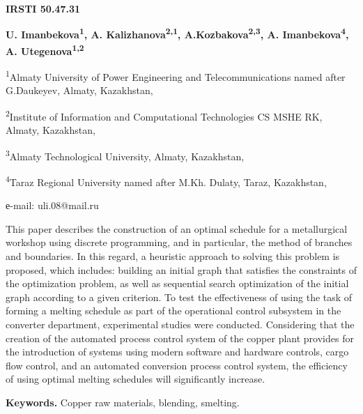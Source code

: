 \newpage
{\bfseries IRSTI 50.47.31}


\begin{center}
{\bfseries U. Imanbekova\textsuperscript{1}, A.
Kalizhanova\textsuperscript{2,1}, A.Kozbakova\textsuperscript{2,3}, A.
Imanbekova\textsuperscript{4}, A. Utegenova\textsuperscript{1,2}}

\textsuperscript{1}Almaty University of Power Engineering and
Telecommunications named after G.Daukeyev, Almaty, Kazakhstan,

\textsuperscript{2}Institute of Information and Computational
Technologies CS MSHE RK, Almaty, Kazakhstan,

\textsuperscript{3}Almaty Technological University, Almaty, Kazakhstan,

\textsuperscript{4}Taraz Regional University named after M.Kh. Dulaty,
Taraz, Kazakhstan,

е-mail: uli.08@mail.ru
\end{center}

This paper describes the construction of an optimal schedule for a
metallurgical workshop using discrete programming, and in particular,
the method of branches and boundaries. In this regard, a heuristic
approach to solving this problem is proposed, which includes: building
an initial graph that satisfies the constraints of the optimization
problem, as well as sequential search optimization of the initial graph
according to a given criterion. To test the effectiveness of using the
task of forming a melting schedule as part of the operational control
subsystem in the converter department, experimental studies were
conducted. Considering that the creation of the automated process
control system of the copper plant provides for the introduction of
systems using modern software and hardware controls, cargo flow control,
and an automated conversion process control system, the efficiency of
using optimal melting schedules will significantly increase.

{\bfseries Keywords.} Copper raw materials, blending, smelting.

